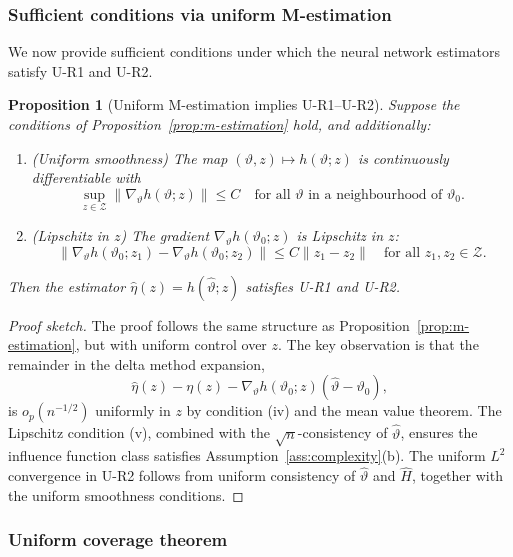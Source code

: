 \documentclass[accepted]{uai2026} %
\theoremstyle{plain}
\newtheorem{proposition}[theorem]{Proposition}
\theoremstyle{definition}
\theoremstyle{remark}
\begin{document}
\subsubsection{Sufficient conditions via uniform M-estimation}
\label{subsubsec:uniform-Mest}

We now provide sufficient conditions under which the neural network estimators
satisfy U-R1 and U-R2.

\begin{proposition}[Uniform M-estimation implies U-R1--U-R2]
\label{prop:uniform-mest}
Suppose the conditions of Proposition~\ref{prop:m-estimation} hold, and
additionally:
\begin{enumerate}
  \item[(iv)] (\emph{Uniform smoothness}) The map
  $(\vartheta, z) \mapsto h(\vartheta;z)$ is continuously differentiable with
  \[
    \sup_{z \in \mathcal{Z}} \|\nabla_\vartheta h(\vartheta;z)\| \le C
    \quad \text{for all } \vartheta \text{ in a neighbourhood of } \vartheta_0.
  \]
  
  \item[(v)] (\emph{Lipschitz in $z$}) The gradient
  $\nabla_\vartheta h(\vartheta_0;z)$ is Lipschitz in $z$:
  \[
    \|\nabla_\vartheta h(\vartheta_0;z_1) - \nabla_\vartheta h(\vartheta_0;z_2)\|
    \le C\|z_1 - z_2\|
    \quad \text{for all } z_1, z_2 \in \mathcal{Z}.
  \]
\end{enumerate}
Then the estimator $\hat\eta(z) = h(\hat\vartheta;z)$ satisfies U-R1 and U-R2.
\end{proposition}

\begin{proof}[Proof sketch]
The proof follows the same structure as Proposition~\ref{prop:m-estimation}, but
with uniform control over $z$. The key observation is that the remainder in
the delta method expansion,
\[
  \hat\eta(z) - \eta(z) - \nabla_\vartheta h(\vartheta_0;z)(\hat\vartheta - \vartheta_0),
\]
is $o_p(n^{-1/2})$ uniformly in $z$ by condition (iv) and the mean value
theorem. The Lipschitz condition (v), combined with the $\sqrt{n}$-consistency
of $\hat\vartheta$, ensures the influence function class satisfies
Assumption~\ref{ass:complexity}(b). The uniform $L^2$ convergence in U-R2
follows from uniform consistency of $\hat\vartheta$ and $\hat H$, together
with the uniform smoothness conditions.
\end{proof}

\subsubsection{Uniform coverage theorem}
\label{subsubsec:uniform-theorem}
\end{document}
